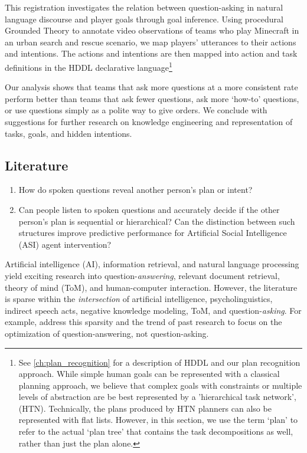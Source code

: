 This registration investigates the relation between question-asking in natural
language discourse and player goals through goal inference. Using procedural
Grounded Theory to annotate video observations of teams who play Minecraft in
an urban search and rescue scenario, we map players' utterances to their actions and
intentions. The actions and intentions are then mapped into action and task
definitions in the HDDL declarative language\footnote{See
    \autoref{ch:plan_recognition}
    for a description of HDDL and our plan
    recognition approach. While simple human goals can be represented with a
    classical planning approach, we believe that complex goals with constraints or
    multiple levels of abstraction are be best represented by a 'hierarchical
    task network', (HTN). Technically, the
    plans produced by HTN planners can also be represented with flat lists.
    However, in this section, we use the term `plan' to refer to the actual
`plan tree' that contains the task decompositions as well, rather than just the
plan alone.}

Our analysis shows that teams that ask more questions at a more consistent rate
perform better than teams that ask fewer questions, ask more `how-to'
questions, or use questions simply as a polite way to give orders. We conclude
with suggestions for further research on knowledge engineering and
representation of tasks, goals, and hidden intentions.

\subsection{Literature}

\begin{enumerate}
    \item How do spoken questions reveal another person's plan or intent?
    \item Can people listen to spoken questions and accurately decide if the other person's plan is sequential or hierarchical? Can the distinction between such structures improve predictive performance for Artificial Social Intelligence (ASI) agent intervention?
\end{enumerate}

Artificial intelligence (AI), information retrieval, and natural language
processing yield exciting research into question-\emph{answering}, relevant
document retrieval, theory of mind (ToM), and human-computer interaction.
However, the literature is sparse within the  \emph{intersection} of artificial
intelligence, psycholinguistics, indirect speech acts, negative knowledge
modeling, ToM, and question-\emph{asking}. For example,
\citet{hawkins_goodman_2017} address this sparsity and the trend of past
research to focus on the optimization of question-answering, not
question-asking.


